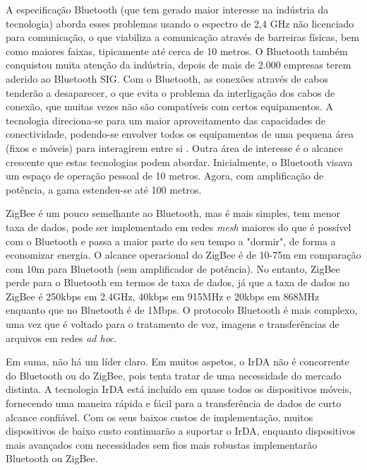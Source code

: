 \documentclass[conference]{IEEEtran}
\begin{document}
A especificação Bluetooth (que tem gerado maior interesse na indústria da tecnologia) aborda esses problemas usando o espectro de 2,4 GHz não licenciado para comunicação, o que viabiliza a comunicação através de barreiras físicas, bem como maiores faixas, tipicamente até cerca de 10 metros. O Bluetooth também conquistou muita atenção da indústria, depois de mais de 2.000 empresas terem aderido ao Bluetooth SIG. Com o Bluetooth, as conexões através de cabos tenderão a desaparecer, o que evita o problema da interligação dos cabos de conexão, que muitas vezes não são compatíveis com certos equipamentos. A tecnologia direciona-se para um maior aproveitamento das capacidades de conectividade, podendo-se envolver todos os equipamentos de uma pequena área (fixos e móveis) para interagirem entre si \cite{kobayashi2004tecnologia}. Outra área de interesse é o alcance crescente que estas tecnologias podem abordar. Inicialmente, o Bluetooth visava um espaço de operação pessoal de 10 metros. Agora, com amplificação de potência, a gama estendeu-se até 100 metros.

ZigBee é um pouco semelhante ao Bluetooth, mas é mais simples, tem menor taxa de dados, pode ser implementado em redes \textit{mesh} maiores do que é possível com o Bluetooth e passa a maior parte do seu tempo a "dormir", de forma a economizar energia. O alcance operacional do ZigBee é de 10-75m em comparação com 10m para Bluetooth (sem amplificador de potência). No entanto, ZigBee perde para o Bluetooth em termos de taxa de dados, já que a taxa de dados no ZigBee é 250kbps em 2.4GHz, 40kbps em 915MHz e 20kbps em 868MHz enquanto que no Bluetooth é de 1Mbps. O protocolo Bluetooth é mais complexo, uma vez que é voltado para o tratamento de voz, imagens e transferências de arquivos em redes \textit{ad hoc}. 

Em suma, não há um líder claro. Em muitos aspetos, o IrDA não é concorrente do Bluetooth ou do ZigBee, pois tenta tratar de uma necessidade do mercado distinta. A tecnologia IrDA está incluído em quase todos os dispositivos móveis, fornecendo uma maneira rápida e fácil para a transferência de dados de curto alcance confiável. Com os seus baixos custos de implementação, muitos dispositivos de baixo custo continuarão a suportar o IrDA, enquanto dispositivos mais avançados com necessidades sem fios mais robustas implementarão Bluetooth ou ZigBee.

{}

\end{document}
